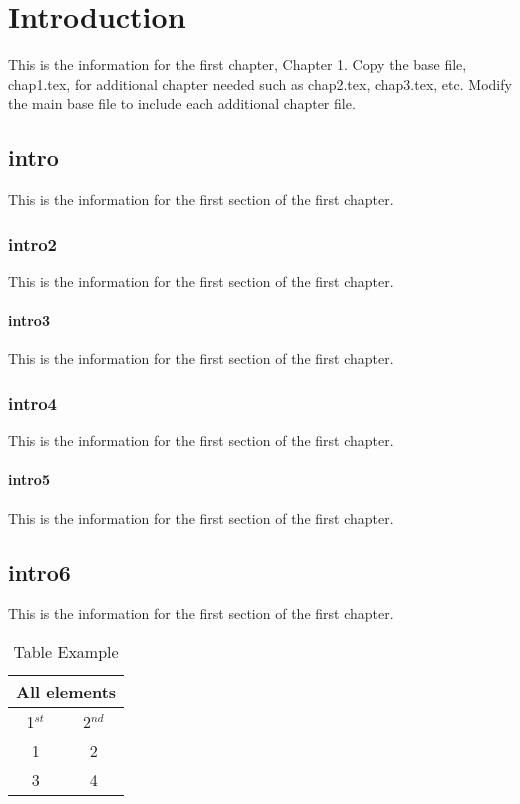 %
%
\chapter{Introduction}
This is the information for the first chapter, Chapter 1.  Copy the base file, chap1.tex, for additional chapter needed such as chap2.tex, chap3.tex, etc. Modify the main base file to include each additional chapter file.

\section{intro}
This is the information for the first section of the first chapter.

\subsection{intro2}
This is the information for the first section of the first chapter.

\subsubsection{intro3}
This is the information for the first section of the first chapter.

\subsection{intro4}
This is the information for the first section of the first chapter.

\subsubsection*{intro5}
This is the information for the first section of the first chapter.

\section*{intro6}
This is the information for the first section of the first chapter.

\begin{table}
\begin{center}
\renewcommand{\arraystretch}{2}
\begin{tabular}{c|c}\hline
\multicolumn{2}{c}{All elements}\\
\hline
1$^{st}$ & 2$^{nd}$\\\hline
1 & 2\\
3 & 4\\\hline
\end{tabular}
\renewcommand{\arraystretch}{1}
\end{center}
\caption{Table Example}
\end{table}


